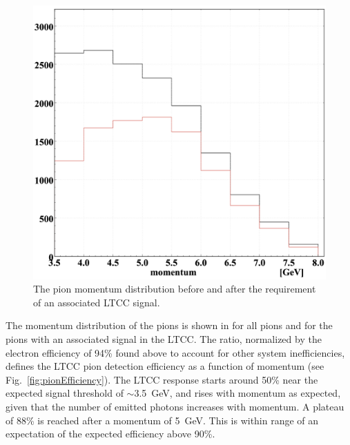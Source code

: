 \begin{figure}
	\centering
	\includegraphics[width=0.98\columnwidth,keepaspectratio]{img/pionMomentum.png}
	\caption{The pion momentum distribution before and after the requirement of an associated LTCC signal.}
	\label{fig:pionMomentum}
\end{figure}

The momentum distribution of the pions is shown in  for all pions and for the pions with an
associated signal in the LTCC. The ratio, normalized by the electron efficiency of 94\% found above to account for
other system inefficiencies, defines the LTCC pion detection efficiency as a function of momentum (see
Fig.~\ref{fig:pionEfficiency}). The LTCC response starts around 50\% near the expected signal threshold of
$\sim$3.5~GeV, and rises with momentum as expected, given that the number of emitted photons increases with
momentum. A plateau of 88\% is reached after a momentum of 5~GeV. This is within range of an expectation of
the expected efficiency above 90\%. 

